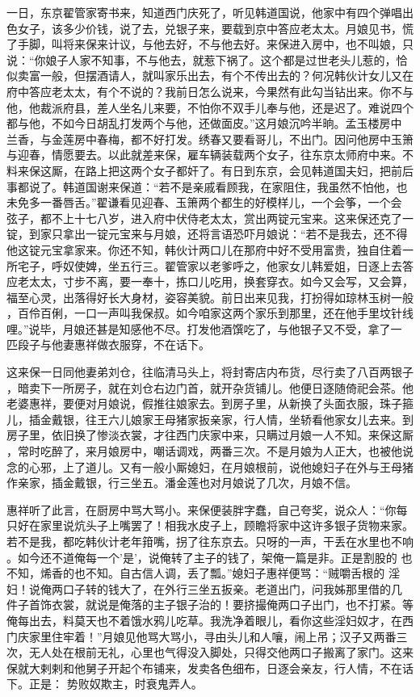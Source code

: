 一日，东京翟管家寄书来，知道西门庆死了，听见韩道国说，他家中有四个弹唱出
色女子，该多少价钱，说了去，兑银子来，要载到京中答应老太太。月娘见书，慌
了手脚，叫将来保来计议，与他去好，不与他去好。来保进入房中，也不叫娘，只
说：“你娘子人家不知事，不与他去，就惹下祸了。这个都是过世老头儿惹的，恰
似卖富一般，但摆酒请人，就叫家乐出去，有个不传出去的？何况韩伙计女儿又在
府中答应老太太，有个不说的？我前日怎么说来，今果然有此勾当钻出来。你不与
他，他裁派府县，差人坐名儿来要，不怕你不双手儿奉与他，还是迟了。难说四个
都与他，不如今日胡乱打发两个与他，还做面皮。”这月娘沉吟半晌。孟玉楼房中
兰香，与金莲房中春梅，都不好打发。绣春又要看哥儿，不出门。因问他房中玉箫
与迎春，情愿要去。以此就差来保，雇车辆装载两个女子，往东京太师府中来。不
料来保这厮，在路上把这两个女子都奸了。有日到东京，会见韩道国夫妇，把前后
事都说了。韩道国谢来保道：“若不是亲戚看顾我，在家阻住，我虽然不怕他，也
未免多一番唇舌。”翟谦看见迎春、玉箫两个都生的好模样儿，一个会筝，一个会
弦子，都不上十七八岁，进入府中伏侍老太太，赏出两锭元宝来。这来保还克了一
锭，到家只拿出一锭元宝来与月娘，还将言语恐吓月娘说：“若不是我去，还不得
他这锭元宝拿家来。你还不知，韩伙计两口儿在那府中好不受用富贵，独自住着一
所宅子，呼奴使婢，坐五行三。翟管家以老爹呼之，他家女儿韩爱姐，日逐上去答
应老太太，寸步不离，要一奉十，拣口儿吃用，换套穿衣。如今又会写，又会算，
福至心灵，出落得好长大身材，姿容美貌。前日出来见我，打扮得如琼林玉树一般
，百伶百俐，一口一声叫我保叔。如今咱家这两个家乐到那里，还在他手里坟针线
哩。”说毕，月娘还甚是知感他不尽。打发他酒馔吃了，与他银子又不受，拿了一
匹段子与他妻惠祥做衣服穿，不在话下。

这来保一日同他妻弟刘仓，往临清马头上，将封寄店内布货，尽行卖了八百两银子
，暗卖下一所房子，就在刘仓右边门首，就开杂货铺儿。他便日逐随倚祀会茶。他
老婆惠祥，要便对月娘说，假推往娘家去。到房子里，从新换了头面衣服，珠子箍
儿，插金戴银，往王六儿娘家王母猪家扳亲家，行人情，坐轿看他家女儿去来。到
房子里，依旧换了惨淡衣裳，才往西门庆家中来，只瞒过月娘一人不知。来保这厮
，常时吃醉了，来月娘房中，嘲话调戏，两番三次。不是月娘为人正大，也被他说
念的心邪，上了道儿。又有一般小厮媳妇，在月娘根前，说他媳妇子在外与王母猪
作亲家，插金戴银，行三坐五。潘金莲也对月娘说了几次，月娘不信。

惠祥听了此言，在厨房中骂大骂小。来保便装胖字蠢，自己夸奖，说众人：“你每
只好在家里说炕头子上嘴罢了！相我水皮子上，顾瞻将家中这许多银子货物来家。
若不是我，都吃韩伙计老年箝嘴，拐了往东京去。只呀的一声，干丢在水里也不响
。如今还不道俺每一个'是'，说俺转了主子的钱了，架俺一篇是非。正是割股的
也不知，烯香的也不知。自古信人调，丢了瓢。”媳妇子惠祥便骂：“贼嚼舌根的
淫妇！说俺两口子转的钱大了，在外行三坐五扳亲。老道出门，问我姊那里借的几
件子首饰衣裳，就说是俺落的主子银子治的！要挤撮俺两口子出门，也不打紧。等
俺每出去，料莫天也不着饿水鸦儿吃草。我洗净着眼儿，看你这些淫妇奴才，在西
门庆家里住牢着！”月娘见他骂大骂小，寻由头儿和人嚷，闹上吊；汉子又两番三
次，无人处在根前无礼，心里也气得没入脚处，只得交他两口子搬离了家门。这来
保就大剌剌和他舅子开起个布铺来，发卖各色细布，日逐会亲友，行人情，不在话
下。正是：
势败奴欺主，时衰鬼弄人。